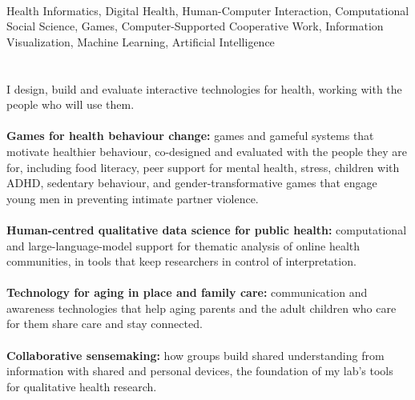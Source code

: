 \documentclass[11pt]{article}
\begin{document}
\sectionbreak
\keepwithnext[6]

\renewcommand\cvcoursescplabel{SCP}
\renewcommand\cvcourseaveragelabel{SPHS Average}
\ifAPR\printcourses[scp]\else\printcourses\fi

\keepwithnext
{}


\sectionbreak[6\baselineskip]
 \\
Health Informatics, Digital Health, Human-Computer Interaction, Computational Social Science, Games, Computer-Supported Cooperative Work, Information Visualization, Machine Learning, Artificial Intelligence
\\ \\
 \\
I design, build and evaluate interactive technologies for health, working with the people who will use them.
\\ \\
\textbf{Games for health behaviour change:} games and gameful systems that motivate healthier behaviour, co-designed and evaluated with the people they are for, including food literacy, peer support for mental health, stress, children with ADHD, sedentary behaviour, and gender-transformative games that engage young men in preventing intimate partner violence.
\\ \\
\textbf{Human-centred qualitative data science for public health:} computational and large-language-model support for thematic analysis of online health communities, in tools that keep researchers in control of interpretation.
\\ \\
\textbf{Technology for aging in place and family care:} communication and awareness technologies that help aging parents and the adult children who care for them share care and stay connected.
\\ \\
\textbf{Collaborative sensemaking:} how groups build shared understanding from information with shared and personal devices, the foundation of my lab's tools for qualitative health research.


\ifAPR
\fi
\end{document}
